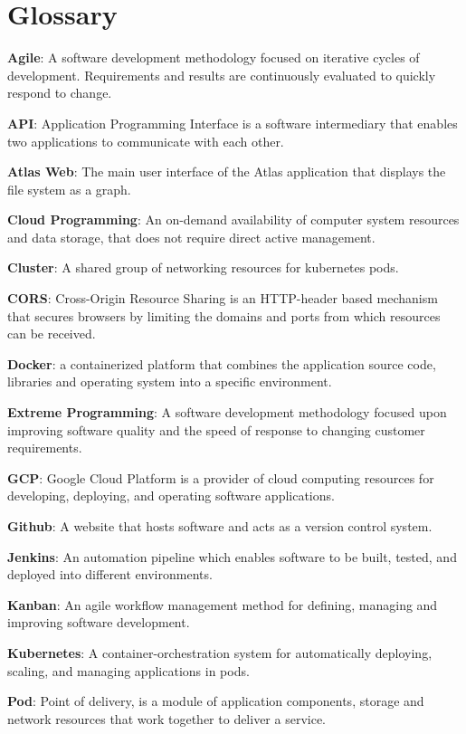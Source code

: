 \documentclass{article}
\begin{document}
\section{Glossary}
{\parindent0pt
\textbf{Agile}: A software development methodology focused on iterative cycles of development. Requirements and results are continuously evaluated to quickly respond to change.

\textbf{API}: Application Programming Interface is a software intermediary that enables two applications to communicate with each other.

\textbf{Atlas Web}: The main user interface of the Atlas application that displays the file system as a graph.

\textbf{Cloud Programming}: An on-demand availability of computer system resources and data storage, that does not require direct active management. 

\textbf{Cluster}: A shared group of networking resources for kubernetes pods.

\textbf{CORS}: Cross-Origin Resource Sharing is an HTTP-header based mechanism that secures browsers by limiting the domains and ports from which resources can be received.

\textbf{Docker}: a containerized platform that combines the application source code, libraries and operating system into a specific environment.

\textbf{Extreme Programming}: A software development methodology focused upon improving software quality and the speed of response to changing customer requirements.

\textbf{GCP}: Google Cloud Platform is a provider of cloud computing resources for developing, deploying, and operating software applications.

\textbf{Github}: A website that hosts software and acts as a version control system.

\textbf{Jenkins}: An automation pipeline which enables software to be built, tested, and deployed into different environments.

\textbf{Kanban}: An agile workflow management method for defining, managing and improving software development.

\textbf{Kubernetes}: A container-orchestration system for automatically deploying, scaling, and managing applications in pods.

\textbf{Pod}: Point of delivery, is a module of application components, storage and network resources that work together to deliver a service.

}
\end{document}
